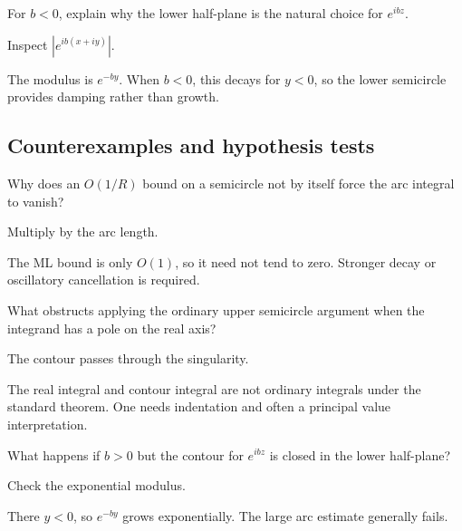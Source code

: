 \begin{exercise}\label{exr:iv11-expand-09}
For \(b<0\), explain why the lower half-plane is the natural choice for \(e^{ibz}\).
\end{exercise}
\begin{hint}
Inspect \(|e^{ib(x+iy)}|\).
\end{hint}
\begin{solution}
The modulus is \(e^{-by}\). When \(b<0\), this decays for \(y<0\), so the lower semicircle provides damping rather than growth.
\end{solution}

\subsection*{Counterexamples and hypothesis tests}

\begin{exercise}\label{exr:iv11-expand-10}
Why does an \(O(1/R)\) bound on a semicircle not by itself force the arc integral to vanish?
\end{exercise}
\begin{hint}
Multiply by the arc length.
\end{hint}
\begin{solution}
The ML bound is only \(O(1)\), so it need not tend to zero. Stronger decay or oscillatory cancellation is required.
\end{solution}

\begin{exercise}\label{exr:iv11-expand-11}
What obstructs applying the ordinary upper semicircle argument when the integrand has a pole on the real axis?
\end{exercise}
\begin{hint}
The contour passes through the singularity.
\end{hint}
\begin{solution}
The real integral and contour integral are not ordinary integrals under the standard theorem. One needs indentation and often a principal value interpretation.
\end{solution}

\begin{exercise}\label{exr:iv11-expand-12}
What happens if \(b>0\) but the contour for \(e^{ibz}\) is closed in the lower half-plane?
\end{exercise}
\begin{hint}
Check the exponential modulus.
\end{hint}
\begin{solution}
There \(y<0\), so \(e^{-by}\) grows exponentially. The large arc estimate generally fails.
\end{solution}

